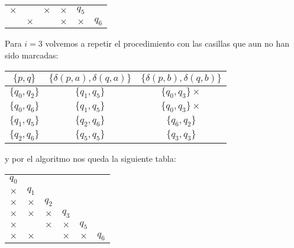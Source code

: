 \begin{itemize}
\begin{center}
\begin{tabular}{ cccccc}
        \multicolumn{1}{|c|}{$\times$} &\multicolumn{1}{|c|}{} &\multicolumn{1}{|c|}{$\times$} &\multicolumn{1}{|c|}{$\times$} &$q_5$ & \\ \cline{1-5}
        \multicolumn{1}{|c|}{} &\multicolumn{1}{|c|}{$\times$} &\multicolumn{1}{|c|}{} &\multicolumn{1}{|c|}{$\times$} &\multicolumn{1}{|c|}{$\times$} &$q_6$ \\ \cline{1-5}
    \end{tabular}
    \end{center}
    Para $i=3$ volvemos a repetir el procedimiento con las casillas que aun no han sido marcadas:
    \begin{center}
        \begin{tabular}{c||c|c}
        $\{p,q\}$ & $\{\delta(p,a),\delta(q,a)\}$ & $\{\delta(p,b),\delta(q,b)\}$ \\ \hline
        $\{q_0,q_2\}$ & $\{q_1,q_5\}$ & $\{q_0,q_3\}\times$ \\ \hline
        $\{q_0,q_6\}$ & $\{q_1,q_5\}$ & $\{q_0,q_3\}\times$ \\ \hline
        $\{q_1,q_5\}$ & $\{q_2,q_6\}$ & $\{q_6,q_2\}$ \\ \hline
        $\{q_2,q_6\}$ & $\{q_5,q_5\}$  & $\{q_3,q_3\}$ \\ \hline  
        \end{tabular}
    \end{center}
    y por el algoritmo nos queda la siguiente tabla:
    \begin{center}
        \begin{tabular}{ cccccc}
        $q_0$& & & & & \\ \cline{1-1}
        \multicolumn{1}{|c|}{$\times$} &$q_1$ & & & & \\ \cline{1-2}
        \multicolumn{1}{|c|}{$\times$} &\multicolumn{1}{|c|}{$\times$} &$q_2$ & & & \\ \cline{1-3}
        \multicolumn{1}{|c|}{$\times$} &\multicolumn{1}{|c|}{$\times$} &\multicolumn{1}{|c|}{$\times$} &$q_3$ & & \\ \cline{1-4}
        \multicolumn{1}{|c|}{$\times$} &\multicolumn{1}{|c|}{} &\multicolumn{1}{|c|}{$\times$} &\multicolumn{1}{|c|}{$\times$} &$q_5$ & \\ \cline{1-5}
        \multicolumn{1}{|c|}{$\times$} &\multicolumn{1}{|c|}{$\times$} &\multicolumn{1}{|c|}{} &\multicolumn{1}{|c|}{$\times$} &\multicolumn{1}{|c|}{$\times$} &$q_6$ \\ \cline{1-5}
    \end{tabular}
    \end{center}

\end{itemize}
